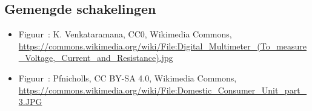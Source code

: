 \documentclass{ximera}
\begin{document}
\subsection*{Gemengde schakelingen}
\begin{itemize}
        \item Figuur~: K. Venkataramana, CC0, Wikimedia Commons, \url{https://commons.wikimedia.org/wiki/File:Digital_Multimeter_(To_measure_Voltage,_Current_and_Resistance).jpg}
        \item Figuur~: Pfnicholls, CC BY-SA 4.0, Wikimedia Commons, \url{https://commons.wikimedia.org/wiki/File:Domestic_Consumer_Unit_part_3.JPG}
\end{itemize}
\end{document}

